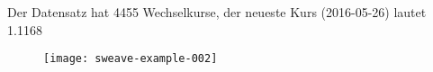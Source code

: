\documentclass[a5paper]{scrartcl}
\begin{document}
Der Datensatz hat 4455 Wechselkurse, der neueste Kurs
(2016-05-26) lautet 1.1168

\begin{figure}
\centering
\texttt{[image: sweave-example-002]}
\end{figure}
\end{document}
